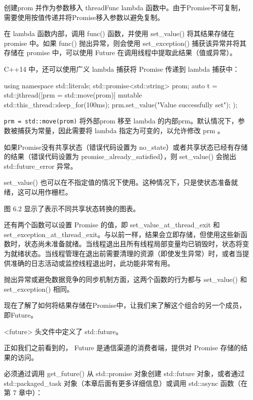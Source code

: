 创建prom 并作为参数移入 threadFunc lambda 函数中。由于Promise不可复制，需要使用按值传递并将Promise移入参数以避免复制。

在 lambda 函数内部，调用 func() 函数，并使用 set\_value() 将其结果存储在 promise 中。如果 func() 抛出异常，则会使用 set\_exception() 捕获该异常并将其存储在 promise 中，可以使用 Future 在调用线程中提取此结果（值或异常）。

C++14 中，还可以使用广义 lambda 捕获将 Promise 传递到 lambda 捕获中：

\begin{cpp}
using namespace std::literals;
std::promise<std::string> prom;
auto t = std::jthread([prm = std::move(prom)] mutable {
    std::this_thread::sleep_for(100ms);
    prm.set_value("Value successfully set");
});
\end{cpp}

\verb|prm = std::move(prom)| 将外部prom 移至 lambda 的内部prm。默认情况下，参数被捕获为常量，因此需要将 lambda 指定为可变的，以允许修改 prm 。

如果Promise没有共享状态（错误代码设置为 no\_state）或者共享状态已经有存储的结果（错误代码设置为 promise\_already\_satisfied），则 set\_value() 会抛出 std::future\_error 异常。

set\_value() 也可以在不指定值的情况下使用。这种情况下，只是使状态准备就绪，这可以用作栅栏。

图 6.2 显示了表示不同共享状态转换的图表。


还有两个函数可以设置 Promise 的值，即 set\_value\_at\_thread\_exit 和 set\_exception\_at\_thread\_exit。与以前一样，结果会立即存储，但使用这些新函数时，状态尚未准备就绪。当线程退出且所有线程局部变量均已销毁时，状态将变为就绪状态。当线程管理在退出前需要清理的资源（即使发生异常）时，或者当提供准确的日志活动或监控线程退出时，此功能非常有用。

抛出异常或避免数据竞争的同步机制方面，这两个函数的行为都与 set\_value() 和 set\_exception() 相同。

现在了解了如何将结果存储在Promise中，让我们来了解这个组合的另一个成员，即Future。


<future> 头文件中定义了 std::future。

正如我们之前看到的， Future 是通信渠道的消费者端，提供对 Promise 存储的结果的访问。

必须通过调用 get\_future() 从 std::promise 对象创建 std::future 对象，或者通过 std::packaged\_task 对象（本章后面有更多详细信息）或调用 std::async 函数（在第 7 章中）：

